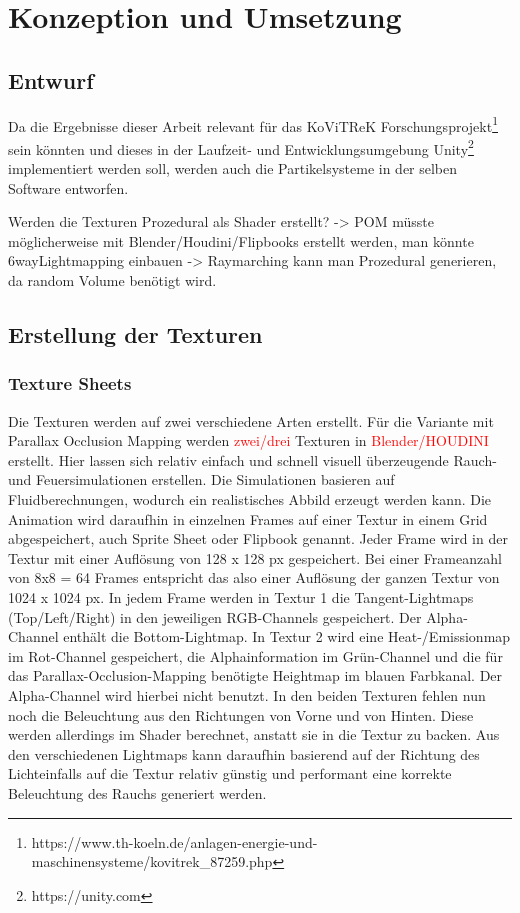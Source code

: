 \section{Konzeption und Umsetzung}
\label{sec:4}
\subsection{Entwurf}

Da die Ergebnisse dieser Arbeit relevant für das KoViTReK Forschungsprojekt\footnote{https://www.th-koeln.de/anlagen-energie-und-maschinensysteme/kovitrek_87259.php} 
sein könnten und dieses in der Laufzeit- und Entwicklungsumgebung Unity\footnote{https://unity.com} 
implementiert werden soll, werden auch die Partikelsysteme in der selben Software entworfen. 

Werden die Texturen Prozedural als Shader erstellt? 
-> POM müsste möglicherweise mit Blender/Houdini/Flipbooks erstellt werden, man könnte 6wayLightmapping einbauen
-> Raymarching kann man Prozedural generieren, da random Volume benötigt wird.



\subsection{Erstellung der Texturen}

\subsubsection{Texture Sheets}

Die Texturen werden auf zwei verschiedene Arten erstellt. Für die Variante mit Parallax Occlusion Mapping werden \textcolor{red}{zwei/drei} 
Texturen in \textcolor{red}{Blender/HOUDINI} erstellt. Hier lassen sich relativ einfach und schnell visuell überzeugende Rauch- und 
Feuersimulationen erstellen. Die Simulationen basieren auf Fluidberechnungen, wodurch ein realistisches Abbild erzeugt werden kann. 
Die Animation wird daraufhin in einzelnen Frames auf einer Textur in einem Grid abgespeichert, auch Sprite Sheet oder Flipbook genannt.
Jeder Frame wird in der Textur mit einer Auflösung von 128 x 128 px gespeichert. Bei einer Frameanzahl von 8x8 = 64 Frames entspricht das also
einer Auflösung der ganzen Textur von 1024 x 1024 px.
In jedem Frame werden in Textur 1 die Tangent-Lightmaps (Top/Left/Right) in den jeweiligen RGB-Channels gespeichert. 
Der Alpha-Channel enthält die Bottom-Lightmap. In Textur 2 wird eine Heat-/Emissionmap im Rot-Channel gespeichert, die Alphainformation im 
Grün-Channel und die für das Parallax-Occlusion-Mapping benötigte Heightmap im blauen Farbkanal. Der Alpha-Channel wird hierbei nicht benutzt.
In den beiden Texturen fehlen nun noch die Beleuchtung aus den Richtungen von Vorne und von Hinten. Diese werden allerdings im Shader 
berechnet, anstatt sie in die Textur zu backen. Aus den verschiedenen Lightmaps kann daraufhin basierend auf der Richtung des Lichteinfalls 
auf die Textur relativ günstig und performant eine korrekte Beleuchtung des Rauchs generiert werden. 




